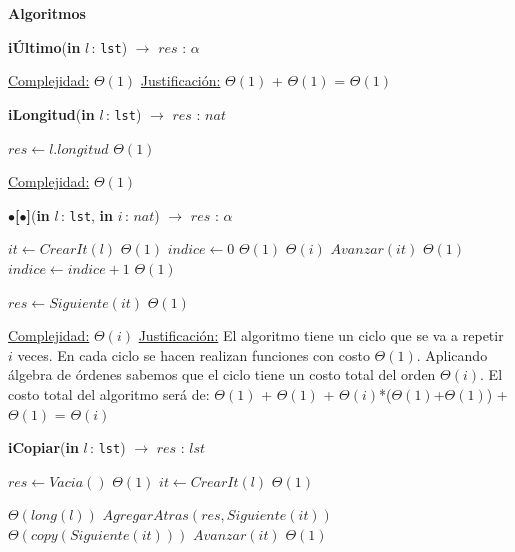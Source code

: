 \documentclass[a4paper,10pt]{article}
\let\TipoVariable=\texttt
\let\ModificadorArgumento=\textbf
\newcommand{\In}[2]{\ModificadorArgumento{in} \ensuremath{#1}\,: \TipoVariable{#2}\xspace}
\newenvironment{Algoritmos}{%
  \vspace*{2ex}%
  \noindent\textbf{\Large Algoritmos}%
  \vspace*{2ex}%
}{}
\begin{document}
\begin{Algoritmos}
\begin{algorithm}[H]{\textbf{iÚltimo}(\In{l}{lst}) $\to$ $res$ : $\alpha$}
\begin{algorithmic}[1]
			\medskip
			\Statex \underline{Complejidad:} $\Theta(1)$
			\Statex \underline{Justificación:} $\Theta(1)$ + $\Theta(1)$ = $\Theta(1)$
    	\end{algorithmic}
\end{algorithm}	
	
\begin{algorithm}[H]{\textbf{iLongitud}(\In{l}{lst}) $\to$ $res$ : $nat$}	
	\begin{algorithmic}[1]
			 \State $res \gets l.longitud$	\Comment $\Theta(1)$ 
    	
		\medskip
		\Statex \underline{Complejidad:}  $\Theta(1)$
    \end{algorithmic}
\end{algorithm}	
	
\begin{algorithm}[H]{\textbf{$\bullet$[$\bullet$]}(\In{l}{lst}, \In{i}{$nat$}) $\to$ $res$ : $\alpha$}	
	\begin{algorithmic}[1]
			 \State $it \gets CrearIt(l)$		\Comment $\Theta(1)$
			 \State $indice \gets 0$		\Comment $\Theta(1)$
			 			\Comment $\Theta(i)$
			 	\State $Avanzar(it)$		\Comment $\Theta(1)$
				\State $indice \gets indice + 1$		\Comment $\Theta(1)$
			 \EndWhile
			 
			 \State $res \gets Siguiente(it)$		\Comment $\Theta(1)$
    	
		\medskip
		\Statex \underline{Complejidad:} $\Theta(i)$
		\Statex \underline{Justificación:} El algoritmo tiene un ciclo que se va a repetir $i$ veces. En cada ciclo se hacen realizan funciones con costo $\Theta(1)$. Aplicando álgebra de órdenes sabemos que el ciclo tiene un costo total del orden $\Theta(i)$. El costo total del algoritmo será de:  $\Theta(1)$ + $\Theta(1)$ + $\Theta(i)$*($\Theta(1)$+$\Theta(1)$) + $\Theta(1)$ = $\Theta(i)$
    \end{algorithmic}
\end{algorithm}	


\begin{algorithm}[H]{\textbf{iCopiar}(\In{l}{lst}) $\to$ $res$ : $lst$}	
	\begin{algorithmic}[1]
			\State $res \gets Vacia()$	\Comment $\Theta(1)$
			\State $it \gets CrearIt(l)$	\Comment $\Theta(1)$
			
			 	\Comment $\Theta(long(l))$
			 	\State $AgregarAtras(res, Siguiente(it))$	\Comment $\Theta(copy(Siguiente(it)))$
				\State $Avanzar(it)$	\Comment $\Theta(1)$
			\EndWhile
    	

\end{algorithmic}
\end{algorithm}
\end{Algoritmos}
\end{document}
